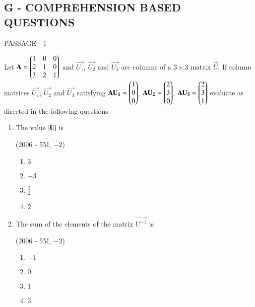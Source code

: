 \documentclass[journal,12pt,twocolumn]{IEEEtran}
\theoremstyle{remark}
\begin{document}
\bigskip

\begin{multicols}{2}

	\section*{G - COMPREHENSION BASED QUESTIONS}

	\bigskip

	{\centering PASSAGE - 1 \par}

	\bigskip	

	Let $\mathbf{A} = \begin{pmatrix}
		1 & 0 & 0 \\
		2 & 1 & 0 \\
	3 & 2 & 1 \end{pmatrix}$ and $\vec{U_1}$, $\vec{U_2}$ and $\vec{U_3}$ are columns of a $3\times3$ matrix $\vec{U}$. If column matrices $\vec{U_1}$, $\vec{U_2}$ and $\vec{U_3}$ satisfying 
	$\mathbf{AU_1} = \begin{pmatrix}
		1 \\
		0 \\
		0 \end{pmatrix}$,
	$\mathbf{AU_2} = \begin{pmatrix}
		2 \\
		3 \\
		0 \end{pmatrix}$,
	$\mathbf{AU_3} = \begin{pmatrix}
		2 \\
		3 \\
		1 \end{pmatrix}$ evaluate as directed in the following questions.

	\begin{enumerate}
		\item The value $\left\vert\mathbf{U}\right\vert$ is

			\hfill(2006 - 5M, $-2$)

			\begin{enumerate}
				\item $3$
				\item $-3$
			\item $\frac{3}{2}$
				\item $2$
			\end{enumerate}

		\item The sum of the elements of the matrix $\vec{U^{-1}}$ is

			\hfill(2006 - 5M, $-2$)

			\begin{enumerate}
				\item $-1$
				\item $0$
				\item $1$
				\item $3$
			\end{enumerate}


\end{enumerate}
\end{multicols}
\end{document}
